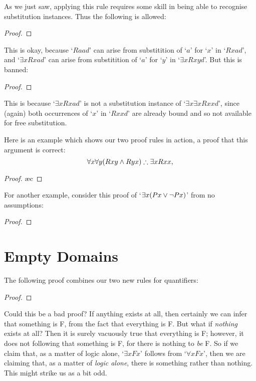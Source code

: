As we just saw, applying this rule requires some skill in being able to recognise substitution instances. Thus the following is allowed:
\begin{proof}
	 
	 
\end{proof} This is okay, because `$Raad$' can arise from substitition of `$a$' for `$x$' in `$Rxad$', and `$\exists x Rxad$' can arise from substitition of `$a$' for `$y$' in `$\exists x Rxyd$'.
But this is banned:
\begin{proof}
	 
\end{proof} This is because `$\exists x Rxad$' is not a substitution instance of `$\exists x \exists x Rxxd$', since (again) both occurrences of `$x$' in `$Rxxd$' are already bound and so not available for free substitution.

Here is an example which shows our two proof rules in action, a proof that this argument is correct: $$\forall x \forall y (Rxy \wedge Ryx) \mathrel{\therefore} \exists x Rxx,$$ \begin{proof}
	\ae{c}
\end{proof}

For another example, consider this proof of `$\exists x (Px \vee \neg Px)$' from no assumptions:\label{exexmid}
\begin{proof}
	\open{}
	\open{}
	\close
	\close
\end{proof}


\section{Empty Domains}
The following proof combines our two new rules for quantifiers:
	\begin{proof}
	\end{proof}
Could this be a bad proof? If anything exists at all, then certainly we can infer that something is F, from the fact that everything is F. But what if \emph{nothing} exists at all? Then it is surely vacuously true that everything is F; however, it does not following that something is F, for there is nothing to \emph{be} F. So if we claim that, as a matter of logic alone, `$\exists x Fx$' follows from `$\forall x Fx$', then we are claiming that, as a matter of \emph{logic alone}, there is something rather than nothing. This might strike us as a bit odd.

